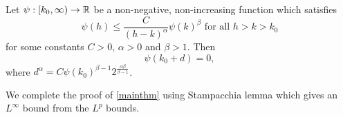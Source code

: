     \begin{lemma}
         Let $ \psi: [k_{0},\infty) \to \mathbb{R} $ be a non-negative, non-increasing function which satisfies \begin{equation}
            \psi(h) \le \frac{C}{(h-k)^{\alpha}} \psi(k)^{\beta} \text{ for all } h> k >k_{0}
        \end{equation}
        for some constants $ C>0 $, $ \alpha > 0 $ and $ \beta >1 $. Then \begin{equation}
            \psi(k_{0}+d) = 0,
        \end{equation}
        where $ d^{\alpha} = C\psi(k_{0})^{\beta-1}2^{\frac{\alpha \beta}{\beta -1}} $.
    \end{lemma}

    We complete the proof of \cref{mainthm} using Stampacchia lemma which gives an $ L^{\infty} $ bound from the $ L^{p} $ bounds.
    \vspace{1pt}
